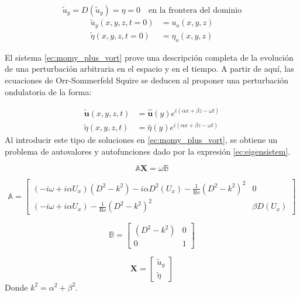 \begin{equation}
\tilde{u}_y = D(\tilde{u}_y) = \eta = 0 \quad \text{en la frontera del dominio}  
\label{ec:bc_orr_som}
\end{equation}
\begin{align}
\tilde{u}_y (x,y,z, t=0) &= u_o(x,y,z) \\
\tilde{\eta} (x,y,z, t=0) &= \eta_o(x,y,z)   
\label{ec:init_orr_som}
\end{align}

El sistema \ref{ec:momy_plus_vort} prove una descripción completa de la evolución de una
perturbación arbitraria en el espacio y en el tiempo. A partir de aquí, las ecuaciones de Orr-Sommerfeld Squire se deducen al  proponer una perturbación ondulatoria de la forma:

\begin{align}
\tilde{\mathbf{u}} (x,y,z,t) &= \hat{\mathbf{u}}(y) e^{ i (\alpha x + \beta z - \omega t)} \\
\tilde{\eta} (x,y,z,t) &= \hat{\eta}(y) e^{ i (\alpha x + \beta z - \omega t)}   
\label{ec:armonic_orr_som_sol}
\end{align}
Al introducir este tipo de soluciones en \ref{ec:momy_plus_vort}, se obtiene un problema de autovalores y
autofunciones dado por la expresión \ref{ec:eigensistem}.

\begin{equation}
\mathbb{A} \mathbf{X} = \omega \mathbb{B}
\label{ec:eigensistem}
\end{equation}


\begin{equation*}
\mathbb{A} = 
\begin{bmatrix}
(- i \omega + i \alpha U_x) (D^2 - k^2) - i \alpha D^2(U_x) - \frac{1}{\text{Re}} (D^2 - k^2)^2  & 0 \\
(- i \omega + i \alpha U_x) - \frac{1}{\text{Re}} (D^2 - k^2)^2  & \beta D(U_x) 
\end{bmatrix}
\end{equation*}

\begin{equation*}
\mathbb{B} = 
\begin{bmatrix}
(D^2 - k^2)  & 0 \\
0  & 1 
\end{bmatrix}
\end{equation*}

\begin{equation*}
\mathbf{X} = 
\begin{bmatrix}
\tilde{u}_y \\ \tilde{\eta}
\end{bmatrix}
\end{equation*}
Donde $k^2 = \alpha^2 + \beta^2$.

